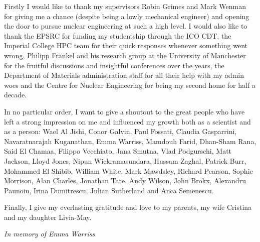 \cleardoublepage


\begin{acknowledgements}

Firstly I would like to thank my supervisors Robin Grimes and Mark Wenman for giving me a chance (despite being a lowly mechanical engineer) and opening the door to pursue nuclear engineering at such a high level. I would also like to thank the EPSRC for funding my studentship through the ICO CDT, the Imperial College HPC team for their quick responses whenever something went wrong, Philipp Frankel and his research group at the University of Manchester for the fruitful discussions and insightful conferences over the years, the Department of Materials administration staff for all their help with my admin woes and the Centre for Nuclear Engineering for being my second home for half a decade.

In no particular order, I want to give a shoutout to the great people who have left a strong impression on me and influenced my growth both as a scientist and as a person: Wael Al Jishi, Conor Galvin, Paul Fossati, Claudia Gasparrini, Navaratnarajah Kuganathan, Emma Warriss, Mamdouh Farid, Dhan-Sham Rana, Said El Chamaa, Filippo Vecchiato, Jana Smutna, Vlad Podgurschi, Matt Jackson, Lloyd Jones, Nipun Wickramasundara, Hussam Zaghal, Patrick Burr, Mohammed El Shibib, William White, Mark Mawdsley, Richard Pearson, Sophie Morrison, Alan Charles, Jonathan Tate, Andy Wilson, John Brokx, Alexandru Paunoiu, Irina Dumitrescu, Julian Sutherland and Anca Semenescu.

Finally, I give my everlasting gratitude and love to my parents, my wife Cristina and my daughter Livia-May.

\clearpage

\begin{center}
\emph{In memory of Emma Warriss}
\end{center}

\end{acknowledgements}
